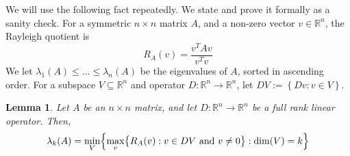 \documentclass{article}
\newcommand{\Reals}{\mathbb{R}}
\newcommand{\set}[1]{\left\{#1\right\}}
\newcommand{\1}{\mathbf{1}}
\theoremstyle{alden}
\theoremstyle{aldenthm}
\newtheorem{lemma}{Lemma}
\theoremstyle{definition}
\theoremstyle{remark}
\begin{document}
We will use the following fact repeatedly. We state and prove it formally as a sanity check. For a symmetric $n \times n$ matrix $A$, and a non-zero vector $v \in \Reals^n$, the Rayleigh quotient is 
\begin{equation*}
R_A(v) = \frac{v^T A v}{v^T v}
\end{equation*}
We let $\lambda_1(A) \leq \ldots \leq \lambda_n(A)$ be the eigenvalues of $A$, sorted in ascending order. For a subspace $V \subseteq \Reals^n$ and operator $D:\Reals^n \to \Reals^n$, let $DV := \set{Dv: v \in V}$.
\begin{lemma}
	\label{lem:variational}
	Let $A$ be an $n \times n$ matrix, and let $D: \Reals^n \to \Reals^n$ be a full rank linear operator. Then,
	\begin{equation*}
	\lambda_k(A) = \min_{V}\Bigl\{ \max_{v}\bigl\{R_{A}(v): v \in DV~\textrm{and}~v \neq 0\bigr\}: \dim(V) = k \Bigr\}
	\end{equation*}
\end{lemma}
\end{document}
